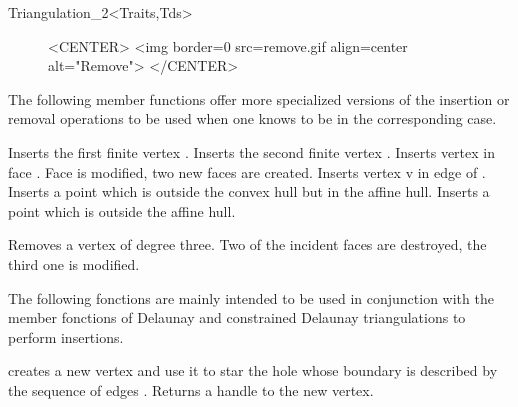 \begin{ccRefClass}{Triangulation_2<Traits,Tds>}
\begin{figure}
\begin{ccHtmlOnly}
<CENTER>
<img border=0 src=remove.gif align=center alt="Remove">
</CENTER>
\end{ccHtmlOnly}
\end{figure}

\begin{ccAdvanced}
The following member functions offer more specialized versions of the
insertion or removal operations to be used when one knows to be in the
corresponding case.

{Inserts the first finite  vertex .}
{Inserts the second finite  vertex .}
 {Inserts vertex  in face
. Face  is modified,
two new faces are created.
}
{Inserts vertex v in edge  of .
}
{Inserts 
 a point which is outside the convex hull  but in the affine hull.
 }
{Inserts 
 a point which is outside the affine hull.}

{Removes a vertex of degree three. Two of the incident faces are destroyed,
the third one is modified.
}

The following fonctions are mainly intended to be used in conjunction
with the  member fonctions of Delaunay and constrained 
Delaunay triangulations to perform insertions.

{creates a new vertex  and use it to star the hole 
whose boundary is described  by the sequence of edges \ccc{[edge_begin, 
edge_end[}. Returns a handle to the new vertex.}


\end{ccAdvanced}
\end{ccRefClass}
